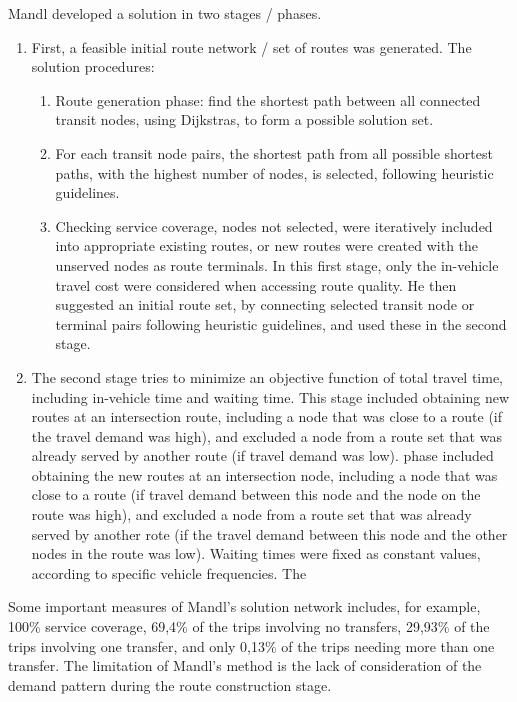 Mandl developed a solution in two stages / phases. 
\begin{enumerate}
\item First, a feasible initial route network / set of routes was generated. The solution procedures:
\begin{enumerate}
 \item Route generation phase: find the shortest path between all connected transit nodes, using Dijkstras, to form a possible solution set. 
 \item For each transit node pairs, the shortest path from all possible shortest paths, with the highest number of nodes, is selected, following heuristic guidelines. 

 \item Checking service coverage, nodes not selected, were iteratively included into appropriate existing routes, or new routes were created with the unserved nodes as route terminals. 
In this first stage, only the in-vehicle travel cost were considered when accessing route quality. He then suggested an initial route set, by connecting selected transit node or terminal pairs following heuristic guidelines, and used these in the second stage. 
 \end{enumerate}
\item The second stage tries to minimize an objective function of total travel time, including in-vehicle time and waiting time. This stage included obtaining new routes at an intersection route, including a node that was close to a route (if the travel demand was high), and excluded a node from a route set that was already served by another route (if travel demand was low). phase included obtaining the new routes at an intersection node, including a node that was close to a route (if travel demand between this node and the node on the route was high), and excluded a node from a route set that was already served by another rote (if the travel demand between this node and the other nodes in the route was low). Waiting times were fixed as constant values, according to specific vehicle frequencies.  The 
\end{enumerate}

Some important measures of Mandl's solution network includes, for example, 100\% service coverage, 69,4\% of the trips involving no transfers, 29,93\% of the trips involving one transfer, and only 0,13\% of the trips needing more than one transfer. The limitation of Mandl's method is the lack of consideration of the demand pattern during the route construction stage.\citep{zhao03}




